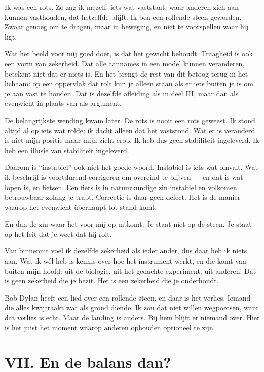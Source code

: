 \documentclass[11pt,a4paper]{article}
\begin{document}
Ik was een rots. Zo zag ik mezelf: iets wat vaststaat, waar anderen zich aan kunnen vasthouden, dat hetzelfde blijft. Ik ben een rollende steen geworden. Zwaar genoeg om te dragen, maar in beweging, en niet te voorspellen waar hij ligt.

Wat het beeld voor mij goed doet, is dat het gewicht behoudt. Traagheid is ook een vorm van zekerheid. Dat alle aannames in een model kunnen veranderen, betekent niet dat er niets is. En het brengt de rest van dit betoog terug in het lichaam: op een oppervlak dat rolt kun je alleen staan als er iets buiten je is om je aan vast te houden. Dat is dezelfde afleiding als in deel III, maar dan als evenwicht in plaats van als argument.

De belangrijkste wending kwam later. De rots is nooit een rots geweest. Ik stond altijd al op iets wat rolde; ik dacht alleen dat het vaststond. Wat er is veranderd is niet mijn positie maar mijn zicht erop. Ik heb dus geen stabiliteit ingeleverd. Ik heb een illusie van stabiliteit ingeleverd.

Daarom is \enquote{instabiel} ook niet het goede woord. Instabiel is iets wat omvalt. Wat ik beschrijf is voortdurend corrigeren om overeind te blijven --- en dat is wat lopen is, en fietsen. Een fiets is in natuurkundige zin instabiel en volkomen betrouwbaar zolang je trapt. Correctie is daar geen defect. Het is de manier waarop het evenwicht überhaupt tot stand komt.

En dan de zin waar het voor mij op uitkomt. Je staat niet op de steen. Je staat op het feit dat je weet dat hij rolt.

Van binnenuit voel ik dezelfde zekerheid als ieder ander, dus daar heb ik niets aan. Wat ik wél heb is kennis over hoe het instrument werkt, en die komt van buiten mijn hoofd: uit de biologie, uit het gedachte-experiment, uit anderen. Dat is geen zekerheid die je bezit. Het is een zekerheid die je onderhoudt.

Bob Dylan heeft een lied over een rollende steen, en daar is het verlies. Iemand die alles kwijtraakt wat als grond diende. Ik zou dat niet willen wegpoetsen, want dat verlies is echt. Maar de landing is anders. Bij hem blijft er niemand over. Hier is het juist het moment waarop anderen ophouden optioneel te zijn.

\section*{VII. En de balans dan?}
\end{document}
